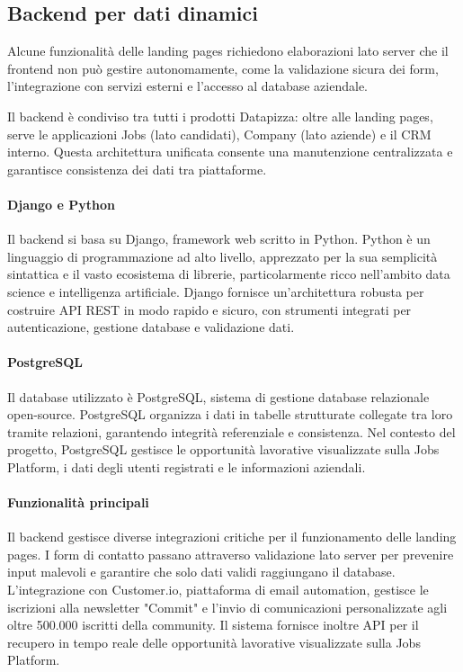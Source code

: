 \subsection{Backend per dati dinamici}

Alcune funzionalità delle landing pages richiedono elaborazioni lato server 
che il frontend non può gestire autonomamente, come la validazione sicura dei 
form, l'integrazione con servizi esterni e l'accesso al database aziendale.

Il backend è condiviso tra tutti i prodotti Datapizza: oltre alle landing pages, 
serve le applicazioni Jobs (lato candidati), Company (lato aziende) e il CRM 
interno. Questa architettura unificata consente una manutenzione centralizzata 
e garantisce consistenza dei dati tra piattaforme.

\paragraph{Django e Python}
Il backend si basa su Django, framework web scritto in Python. Python è un 
linguaggio di programmazione ad alto livello, apprezzato per la sua semplicità 
sintattica e il vasto ecosistema di librerie, particolarmente ricco nell'ambito 
data science e intelligenza artificiale. Django fornisce un'architettura robusta 
per costruire API REST in modo rapido e sicuro, con strumenti integrati per 
autenticazione, gestione database e validazione dati.

\paragraph{PostgreSQL}
Il database utilizzato è PostgreSQL, sistema di gestione database relazionale 
open-source. PostgreSQL organizza i dati in tabelle strutturate collegate tra 
loro tramite relazioni, garantendo integrità referenziale e consistenza. Nel 
contesto del progetto, PostgreSQL gestisce le opportunità lavorative visualizzate 
sulla Jobs Platform, i dati degli utenti registrati e le informazioni aziendali.

\paragraph{Funzionalità principali}
Il backend gestisce diverse integrazioni critiche per il funzionamento delle 
landing pages. I form di contatto passano attraverso validazione lato server 
per prevenire input malevoli e garantire che solo dati validi raggiungano il 
database. L'integrazione con Customer.io, piattaforma di email automation, 
gestisce le iscrizioni alla newsletter "Commit" e l'invio di comunicazioni 
personalizzate agli oltre 500.000 iscritti della community. Il sistema fornisce 
inoltre API per il recupero in tempo reale delle opportunità lavorative 
visualizzate sulla Jobs Platform.

